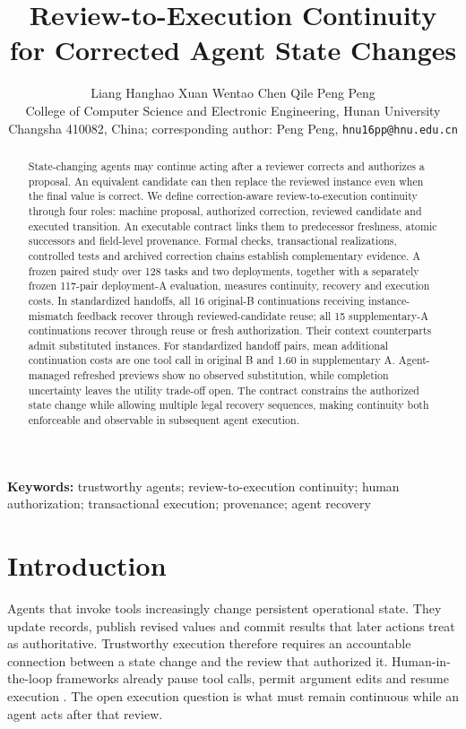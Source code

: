 \documentclass[10pt,a4paper,twocolumn]{article}
\title{Review-to-Execution Continuity for Corrected Agent State Changes}
\author{Liang Hanghao \quad Xuan Wentao \quad Chen Qile \quad Peng Peng\\
\small College of Computer Science and Electronic Engineering, Hunan University\\
\small Changsha 410082, China; corresponding author: Peng Peng, \texttt{hnu16pp@hnu.edu.cn}}
\date{}
\begin{document}
\maketitle
\begin{abstract}
State-changing agents may continue acting after a reviewer corrects and authorizes a proposal. An equivalent candidate can then replace the reviewed instance even when the final value is correct. We define correction-aware review-to-execution continuity through four roles: machine proposal, authorized correction, reviewed candidate and executed transition. An executable contract links them to predecessor freshness, atomic successors and field-level provenance. Formal checks, transactional realizations, controlled tests and archived correction chains establish complementary evidence. A frozen paired study over 128 tasks and two deployments, together with a separately frozen 117-pair deployment-A evaluation, measures continuity, recovery and execution costs. In standardized handoffs, all 16 original-B continuations receiving instance-mismatch feedback recover through reviewed-candidate reuse; all 15 supplementary-A continuations recover through reuse or fresh authorization. Their context counterparts admit substituted instances. For standardized handoff pairs, mean additional continuation costs are one tool call in original B and 1.60 in supplementary A. Agent-managed refreshed previews show no observed substitution, while completion uncertainty leaves the utility trade-off open. The contract constrains the authorized state change while allowing multiple legal recovery sequences, making continuity both enforceable and observable in subsequent agent execution.
\end{abstract}
\noindent\textbf{Keywords:} trustworthy agents; review-to-execution continuity; human authorization; transactional execution; provenance; agent recovery

\section{Introduction}
Agents that invoke tools increasingly change persistent operational state. They update records, publish revised values and commit results that later actions treat as authoritative. Trustworthy execution therefore requires an accountable connection between a state change and the review that authorized it. Human-in-the-loop frameworks already pause tool calls, permit argument edits and resume execution \citep{langchainHITL}. The open execution question is what must remain continuous while an agent acts after that review.
\end{document}
